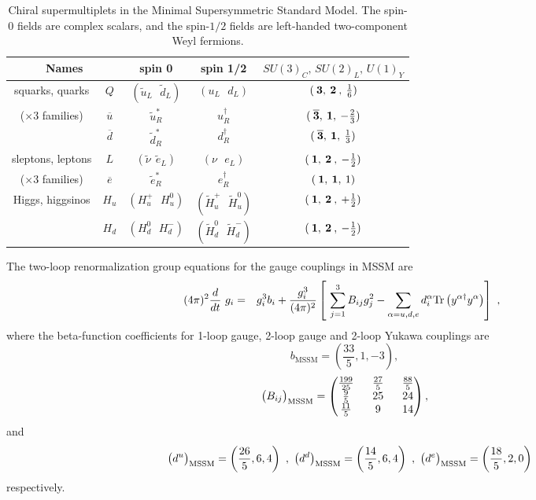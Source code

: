 \documentclass[11pt,prd,superscriptaddress,nofootinbib]{revtex4-1}
\def\sbar{\overline}
\def\stilde{\widetilde}
\numberwithin{equation}{section}
\newcommand{\be}{\begin{equation}}
\newcommand{\ee}{\end{equation}}
\def\stilde{\widetilde}
\begin{document}
\begin{table}[H]
\begin{center}
\begin{tabular}{|c|c|c|c|c|}
\hline
\multicolumn{2}{|c|}{Names} 
& spin 0 & spin 1/2 & $SU(3)_C ,\, SU(2)_L ,\, U(1)_Y$
\\  \hline\hline
squarks, quarks & $Q$ & $({\stilde u}_L\>\>\>{\stilde d}_L )$&
 $(u_L\>\>\>d_L)$ & $(\>{\bf 3},\>{\bf 2}\>,\>{1\over 6})$
\\
($\times 3$ families) & $\sbar u$
&${\stilde u}^*_R$ & $u^\dagger_R$ & 
$(\>{\bf \overline 3},\> {\bf 1},\> -{2\over 3})$
\\ & $\sbar d$ &${\stilde d}^*_R$ & $d^\dagger_R$ & 
$(\>{\bf \overline 3},\> {\bf 1},\> {1\over 3})$
\\  \hline
sleptons, leptons & $L$ &$({\stilde \nu}\>\>{\stilde e}_L )$&
 $(\nu\>\>\>e_L)$ & $(\>{\bf 1},\>{\bf 2}\>,\>-{1\over 2})$
\\
($\times 3$ families) & $\sbar e$
&${\stilde e}^*_R$ & $e^\dagger_R$ & $(\>{\bf 1},\> {\bf 1},\>1)$
\\  \hline
Higgs, higgsinos &$H_u$ &$(H_u^+\>\>\>H_u^0 )$&
$(\stilde H_u^+ \>\>\> \stilde H_u^0)$& 
$(\>{\bf 1},\>{\bf 2}\>,\>+{1\over 2})$
\\ &$H_d$ & $(H_d^0 \>\>\> H_d^-)$ & $(\stilde H_d^0 \>\>\> \stilde H_d^-)$& 
$(\>{\bf 1},\>{\bf 2}\>,\>-{1\over 2})$
\\  \hline
\end{tabular}
\caption{Chiral supermultiplets in the Minimal Supersymmetric Standard Model.
The spin-$0$ fields are complex scalars, and the spin-$1/2$ fields are 
left-handed two-component Weyl fermions.\label{tab:chiral}}
\vspace{-0.6cm}
\end{center}
\end{table}

The two-loop renormalization group equations for the gauge couplings in MSSM are
\begin{eqnarray}
(4\pi)^2\frac{d}{dt}~ g_i &=& g_i^3 b_i 
 +\frac{g_i^3}{(4\pi)^2}
\left[~ \sum_{j=1}^3 B_{ij}  g_j^2-\sum_{\alpha=u,d,e}d_i^\alpha
{\rm Tr}\left( y^{\alpha \dagger}y^{\alpha}\right) \right] ~,~\,
\label{SUSYgauge}
\end{eqnarray}
where the beta-function coefficients for 1-loop gauge, 2-loop gauge and 2-loop Yukawa couplings are 
\be
\label{MSSMbcoeff}
b_{\mathrm{MSSM}}=\left(\frac{33}{5},1,-3\right), 
\ee
\be
\label{MSSMBcoeff}
\big(B_{ij}\big)_{\rm MSSM}=\begin{pmatrix}\frac{199}{25}&~~
\frac{27}{5}& ~~\frac{88}{5}\cr \frac{9}{5} & ~~25& ~~24 \cr
\frac{11}{5}& ~~9& ~~14 \end{pmatrix},
\ee
and 
\begin{eqnarray}
\label{MSSMYukcoeff}
&&\big(d^u\big)_{\rm{MSSM}}=\left(\frac{26}{5},6,4\right) ~,~
\big(d^d\big)_{\rm{MSSM}}=\left(\frac{14}{5},6,4\right) ~,~
\big(d^e\big)_{\rm{MSSM}}=\left(\frac{18}{5},2,0\right)  
\end{eqnarray}
respectively.
\end{document}
